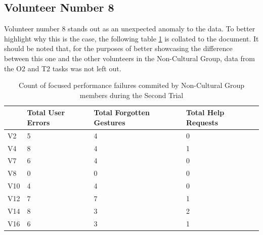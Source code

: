 \subsection{Volunteer Number 8} \label{sec:results_game_volunteernumber8}
    Volunteer number 8 stands out as an unexpected anomaly to the data. To better highlight why this is the case, the following table \ref{tab:Table_Volunteer 8} is collated to the document. It should be noted that, for the purposes of better showcasing the difference between this one and the other volunteers in the Non-Cultural Group, data from the O2 and T2 tasks was not left out.\\
    
    \begin{table}[ht]
    \begin{tabular}{|l|l|l|l|}
    \hline
    & Total User Errors & Total Forgotten Gestures & Total Help Requests \\ \hline
    V2  & 5                 & 4                        & 0                   \\ \hline
    V4  & 8                 & 4                        & 1                   \\ \hline
    V7  & 6                 & 4                        & 0                   \\ \hline
    \rowcolor[HTML]{e2ffe1} 
    V8  & 0                 & 0                        & 0                   \\ \hline
    V10 & 4                 & 4                        & 0                   \\ \hline
    V12 & 7                 & 7                        & 1                   \\ \hline
    V14 & 8                 & 3                        & 2                   \\ \hline
    V16 & 6                 & 3                        & 1                   \\ \hline
    \end{tabular}
    \caption{\label{tab:Table_Volunteer 8}Count of focused performance failures commited by Non-Cultural Group members during the Second Trial}
    \end{table}
    
